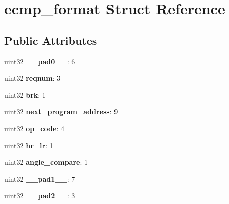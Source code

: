 \hypertarget{structecmp__format}{}\section{ecmp\+\_\+format Struct Reference}
\label{structecmp__format}
\subsection*{Public Attributes}
\begin{DoxyCompactItemize}
\item 
\mbox{\label{structecmp__format_ab7ec107226dee4cbc3e44ce430f55f7e}} 
uint32 {\bfseries \+\_\+\+\_\+pad0\+\_\+\+\_\+}\+: 6
\item 
\mbox{\label{structecmp__format_a749bcc7b830119e45dd1707687088db1}} 
uint32 {\bfseries reqnum}\+: 3
\item 
\mbox{\label{structecmp__format_a265c501c3639c05975fcd3d88cdb0cbf}} 
uint32 {\bfseries brk}\+: 1
\item 
\mbox{\label{structecmp__format_ab815f2a36184b54ffaa3d58a04bf5fc1}} 
uint32 {\bfseries next\+\_\+program\+\_\+address}\+: 9
\item 
\mbox{\label{structecmp__format_adb4fe2ed88cc4b9c664a4feb16a27521}} 
uint32 {\bfseries op\+\_\+code}\+: 4
\item 
\mbox{\label{structecmp__format_af214d7000633ac7515cc332b5dedd093}} 
uint32 {\bfseries hr\+\_\+lr}\+: 1
\item 
\mbox{\label{structecmp__format_ae9a333f0b719d075362e248a83c5a252}} 
uint32 {\bfseries angle\+\_\+compare}\+: 1
\item 
\mbox{\label{structecmp__format_a1e6e44a80b7d3c0b63eb8e090c2b1f05}} 
uint32 {\bfseries \+\_\+\+\_\+pad1\+\_\+\+\_\+}\+: 7
\item 
\mbox{\label{structecmp__format_a93705ef431410534a5dda38ef3e54267}} 
uint32 {\bfseries \+\_\+\+\_\+pad2\+\_\+\+\_\+}\+: 3
\item 

\end{DoxyCompactItemize}
